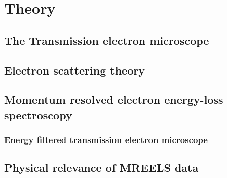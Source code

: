\section{Theory}
\subsection{The Transmission electron microscope}
\subsection{Electron scattering theory}
\subsection{Momentum resolved electron energy-loss spectroscopy}
\subsubsection{Energy filtered transmission electron microscope}
\subsection{Physical relevance of MREELS data}
\cite{doi:10.1021/acs.nanolett.9b03928}
\cite{doi:10.1021/acsphotonics.7b00103}
\cite{doi:10.1063/1.4921405}